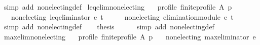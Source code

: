 \begin{isabellebody}
\ {\isacharparenleft}{\kern0pt}simp\ add{\isacharcolon}{\kern0pt}\ non{\isacharunderscore}{\kern0pt}electing{\isacharunderscore}{\kern0pt}def{\isacharparenright}{\kern0pt}%
\endisatagproof
{\isafoldproof}%
%
\isadelimproof
\isanewline
%
\endisadelimproof
\isanewline
{}\isamarkupfalse%
\ leq{\isacharunderscore}{\kern0pt}elim{\isacharunderscore}{\kern0pt}non{\isacharunderscore}{\kern0pt}electing{\isacharcolon}{\kern0pt}\isanewline
\ \ \ profile{\isacharcolon}{\kern0pt}\ {\isachardoublequoteopen}finite{\isacharunderscore}{\kern0pt}profile\ A\ p{\isachardoublequoteclose}\isanewline
\ \ \ {\isachardoublequoteopen}non{\isacharunderscore}{\kern0pt}electing\ {\isacharparenleft}{\kern0pt}leq{\isacharunderscore}{\kern0pt}eliminator\ e\ t{\isacharparenright}{\kern0pt}{\isachardoublequoteclose}\isanewline
%
\isadelimproof
%
\endisadelimproof
%
\isatagproof
{}\isamarkupfalse%
\ {\isacharminus}{\kern0pt}\isanewline
\ \ \isamarkupfalse%
\ {\isachardoublequoteopen}non{\isacharunderscore}{\kern0pt}electing\ {\isacharparenleft}{\kern0pt}elimination{\isacharunderscore}{\kern0pt}module\ e\ t\ {\isacharparenleft}{\kern0pt}{\isasymle}{\isacharparenright}{\kern0pt}{\isacharparenright}{\kern0pt}{\isachardoublequoteclose}\isanewline
\ \ \ \ \isamarkupfalse%
\ {\isacharparenleft}{\kern0pt}simp\ add{\isacharcolon}{\kern0pt}\ non{\isacharunderscore}{\kern0pt}electing{\isacharunderscore}{\kern0pt}def{\isacharparenright}{\kern0pt}\isanewline
\ \ \isamarkupfalse%
\ {\isacharquery}{\kern0pt}thesis\isanewline
\ \ \ \ \isamarkupfalse%
\ {\isacharparenleft}{\kern0pt}simp\ add{\isacharcolon}{\kern0pt}\ non{\isacharunderscore}{\kern0pt}electing{\isacharunderscore}{\kern0pt}def{\isacharparenright}{\kern0pt}\isanewline
{}\isamarkupfalse%
%
\endisatagproof
{\isafoldproof}%
%
\isadelimproof
\isanewline
%
\endisadelimproof
\isanewline
{}\isamarkupfalse%
\ max{\isacharunderscore}{\kern0pt}elim{\isacharunderscore}{\kern0pt}non{\isacharunderscore}{\kern0pt}electing{\isacharcolon}{\kern0pt}\isanewline
\ \ \ profile{\isacharcolon}{\kern0pt}\ {\isachardoublequoteopen}finite{\isacharunderscore}{\kern0pt}profile\ A\ p{\isachardoublequoteclose}\isanewline
\ \ \ {\isachardoublequoteopen}non{\isacharunderscore}{\kern0pt}electing\ {\isacharparenleft}{\kern0pt}max{\isacharunderscore}{\kern0pt}eliminator\ e{\isacharparenright}{\kern0pt}{\isachardoublequoteclose}\isanewline
%
\isadelimproof
%
\endisadelimproof
%

\end{isabellebody}
